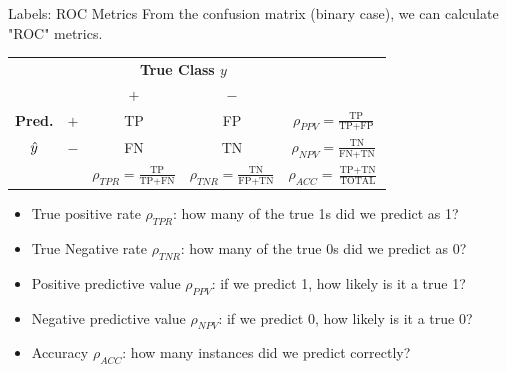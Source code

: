 \documentclass[11pt,compress,t,notes=noshow, xcolor=table]{beamer}
\begin{document}
\begin{vbframe}{Labels: ROC Metrics}
From the confusion matrix (binary case), we can calculate "ROC" metrics.



\begin{center}
\small
\renewcommand{\arraystretch}{1.5}
\begin{tabular}{cc||cc|c}
    & & \multicolumn{2}{c|}{\bfseries True Class $y$} & \\
    & & $+$ & $-$ & \\
    \hline \hline
    \bfseries Pred.     & $+$ & TP & FP & $\rho_{PPV} = \frac{\text{TP}}{\text{TP} + \text{FP}}$\\
              $\hat{y}$ & $-$ & FN & TN & $\rho_{NPV} = \frac{\text{TN}}{\text{FN} + \text{TN}}$\\
    \hline
    & & $\rho_{TPR} = \frac{\text{TP}}{\text{TP} + \text{FN}}$ & $\rho_{TNR} = \frac{\text{TN}}{\text{FP} + \text{TN}}$ & $\rho_{ACC} = \frac{\text{TP}+ \text{TN}}{\text{TOTAL}}$
\end{tabular}
\renewcommand{\arraystretch}{1}
\end{center}

\begin{itemize}
  \small
  \item True positive rate $\rho_{TPR}$: how many of the true 1s did we predict
  as 1?
  \item True Negative rate $\rho_{TNR}$: how many of the true 0s did we predict
  as 0?
  \item Positive predictive value $\rho_{PPV}$: if we predict 1, how likely is
  it a true 1?
  \item Negative predictive value $\rho_{NPV}$: if we predict 0, how likely is
  it a true 0?
  \item Accuracy $\rho_{ACC}$: how many instances did we predict correctly?
\end{itemize}
\end{vbframe}
\end{document}
